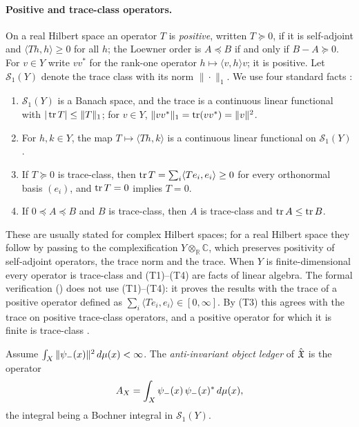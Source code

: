 \paragraph{Positive and trace-class operators.}
On a real Hilbert space an operator \(T\) is \emph{positive}, written
\(T\succeq0\), if it is self-adjoint and \(\langle Th,h\rangle\geq0\)
for all \(h\); the Loewner order is \(A\preceq B\) if and only if
\(B-A\succeq0\).  For \(v\in Y\) write \(vv^*\) for the rank-one
operator \(h\mapsto\langle v,h\rangle v\); it is positive.  Let
\(\mathcal S_1(Y)\) denote the trace class with its norm
\(\|\cdot\|_1\).  We use four standard facts
\citep{Simon2005,ReedSimon1980}:
\begin{enumerate}[label=(T\arabic*)]
  \item \(\mathcal S_1(Y)\) is a Banach space, and the trace is a
    continuous linear functional with \(|\operatorname{tr} T|\leq\|T\|_1\); for
    \(v\in Y\), \(\|vv^*\|_1=\operatorname{tr}(vv^*)=\|v\|^2\).
  \item For \(h,k\in Y\), the map \(T\mapsto\langle Th,k\rangle\) is a
    continuous linear functional on \(\mathcal S_1(Y)\).
  \item If \(T\succeq0\) is trace-class, then
    \(\operatorname{tr} T=\sum_i\langle Te_i,e_i\rangle\geq0\) for every
    orthonormal basis \((e_i)\), and \(\operatorname{tr} T=0\) implies \(T=0\).
  \item If \(0\preceq A\preceq B\) and \(B\) is trace-class, then \(A\)
    is trace-class and \(\operatorname{tr} A\leq\operatorname{tr} B\).
\end{enumerate}
These are usually stated for complex Hilbert spaces; for a real
Hilbert space they follow by passing to the complexification
\(Y\otimes_{\mathbb R}\mathbb C\), which preserves positivity of
self-adjoint operators, the trace norm and the trace.  When \(Y\) is
finite-dimensional every operator is trace-class and (T1)--(T4) are
facts of linear algebra.  The formal verification
() does not use (T1)--(T4): it proves the
results with the trace of a positive operator defined as
\(\sum_i\langle Te_i,e_i\rangle\in[0,\infty]\).  By (T3) this agrees
with the trace on positive trace-class operators, and a positive
operator for which it is finite is trace-class
\citep{ReedSimon1980}.

\begin{definition}
\label{def:duality_confinement:anti-invariant-ledger}
Assume \(\int_X\|\psi_{-}(x)\|^2\,d\mu(x)<\infty\).  The
\emph{anti-invariant object ledger} of \(\hat{\mathfrak{X}}\) is the operator
\[
  A_{X}=\int_X \psi_{-}(x)\,\psi_{-}(x)^*\,d\mu(x),
\]
the integral being a Bochner integral in \(\mathcal S_1(Y)\).
\end{definition}

